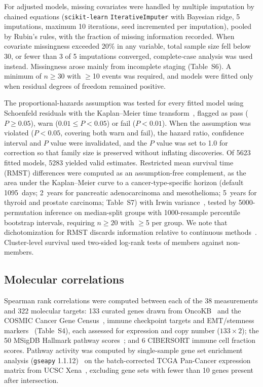 For adjusted models, missing covariates were handled by multiple imputation by
chained equations (\texttt{scikit-learn} \texttt{IterativeImputer} with Bayesian
ridge, 5 imputations, maximum 10 iterations, seed incremented per imputation),
pooled by Rubin's rules, with the fraction of missing information recorded. When
covariate missingness exceeded 20\% in any variable, total sample size fell below
30, or fewer than 3 of 5 imputations converged, complete-case analysis was used
instead. Missingness arose mainly from incomplete staging (Table~S6). A minimum of $n \geq 30$ with $\geq$10 events was required, and models
were fitted only when residual degrees of freedom remained positive.

The proportional-hazards assumption was tested for every fitted model using
Schoenfeld residuals with the Kaplan--Meier time transform~\cite{grambsch1994},
flagged as pass ($P \geq 0.05$), warn ($0.01 \leq P < 0.05$) or fail
($P < 0.01$). When the assumption was violated ($P < 0.05$, covering both warn
and fail), the hazard ratio, confidence interval and $P$ value were invalidated,
and the $P$ value was set to 1.0 for correction so that family size is preserved
without inflating discoveries. Of \num{5623} fitted models, \num{5283} yielded
valid estimates. Restricted mean survival time (RMST) differences were computed
as an assumption-free complement, as the area under the Kaplan--Meier curve to a
cancer-type-specific horizon (default \num{1095}~days; 2~years for pancreatic
adenocarcinoma and mesothelioma; 5~years for thyroid and prostate carcinoma;
Table~S7) with Irwin variance~\cite{irwin1949}, tested by
\num{5000}-permutation inference on median-split groups with \num{1000}-resample
percentile bootstrap intervals, requiring $n \geq 20$ with $\geq$5 per group. We
note that dichotomization for RMST discards information relative to continuous
methods~\cite{royston2006}. Cluster-level survival used two-sided log-rank tests
of members against non-members.

\subsection{Molecular correlations}
\label{sec:methods:correlations}

Spearman rank correlations were computed between each of the 38 measurements and
322 molecular targets: 133 curated genes drawn from OncoKB~\cite{oncokb} and the
COSMIC Cancer Gene Census~\cite{sondka2018cgc}, immune checkpoint targets and
EMT/stemness markers~\cite{nieto2016emt} (Table~S4), each assessed
for expression and copy number ($133 \times 2$); the 50 MSigDB Hallmark pathway
scores~\cite{liberzon2015}; and 6
CIBERSORT immune cell fraction scores. Pathway activity was computed by
single-sample gene set enrichment analysis (\texttt{gseapy}
1.1.12)~\cite{barbie2009ssgsea, fang2023gseapy} on the batch-corrected TCGA Pan-Cancer expression
matrix from UCSC Xena~\cite{goldman2020xena}, excluding gene sets with fewer than
10 genes present after intersection.

